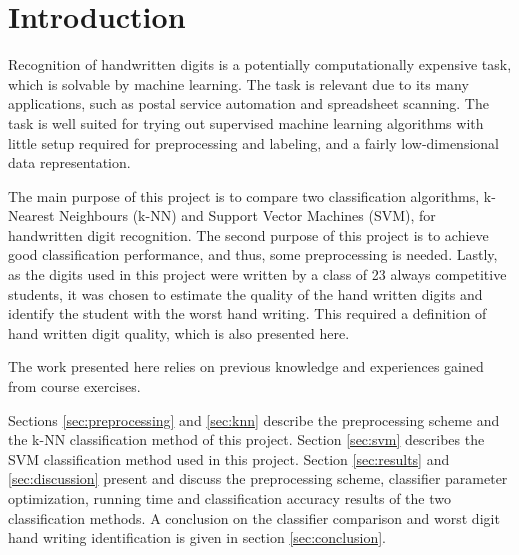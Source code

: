\section{Introduction}
Recognition of handwritten digits is a potentially computationally expensive
task, which is solvable by machine learning. The task is
relevant due to its many applications, such as
postal service automation
and
spreadsheet scanning.
The task is well suited for trying out supervised machine learning algorithms
with little setup required for preprocessing and labeling,
and a fairly low-dimensional data representation.

The main purpose of this project is to compare two classification algorithms,
k-Nearest Neighbours (k-NN) and Support Vector Machines (SVM),
for handwritten digit recognition.
The second purpose of this project is to achieve good classification performance,
and thus, some preprocessing is needed.
Lastly, as the digits used in this project
were written by a class of 23 always competitive students,
it was chosen to estimate the quality of the hand written digits
and identify the student with the worst hand writing.
This required a definition of hand written digit quality,
which is also presented here.

The work presented here relies on previous knowledge
and experiences gained from course exercises.

Sections \ref{sec:preprocessing} and \ref{sec:knn}
describe the preprocessing scheme and the k-NN
classification method of this project.
Section \ref{sec:svm}
describes the SVM classification method used in this project.
Section \ref{sec:results} and \ref{sec:discussion}
present and discuss the preprocessing scheme,
classifier parameter optimization,
running time and classification accuracy results
of the two classification methods.
A conclusion on the classifier comparison
and worst digit hand writing identification
is given in section \ref{sec:conclusion}.